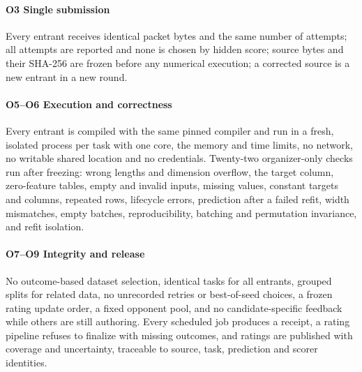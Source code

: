 \paragraph{O3 Single submission} Every entrant receives identical packet bytes and the same number of
attempts; all attempts are reported and none is chosen by hidden score; source bytes and their
SHA-256 are frozen before any numerical execution; a corrected source is a new entrant in a new round.

\paragraph{O5--O6 Execution and correctness} Every entrant is compiled with the same pinned compiler and
run in a fresh, isolated process per task with one core, the memory and time limits, no network, no
writable shared location and no credentials. Twenty-two organizer-only checks run after freezing:
wrong lengths and dimension overflow, the target column, zero-feature tables, empty and invalid
inputs, missing values, constant targets and columns, repeated rows, lifecycle errors, prediction
after a failed refit, width mismatches, empty batches, reproducibility, batching and permutation
invariance, and refit isolation.

\paragraph{O7--O9 Integrity and release} No outcome-based dataset selection, identical tasks for all
entrants, grouped splits for related data, no unrecorded retries or best-of-seed choices, a frozen
rating update order, a fixed opponent pool, and no candidate-specific feedback while others are still
authoring. Every scheduled job produces a receipt, a rating pipeline refuses to finalize with missing
outcomes, and ratings are published with coverage and uncertainty, traceable to source, task,
prediction and scorer identities.
